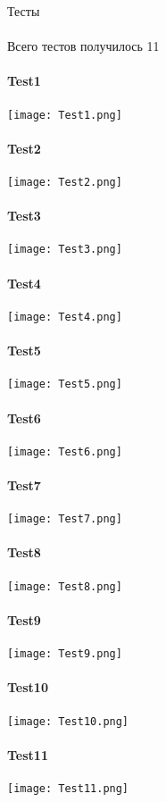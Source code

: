 \documentclass{article}
\begin{document}
\newpage
\huge{Тесты} \\ \\
\Large{Всего тестов получилось 11}
\\ \\
\Large{\textbf{Test1}}
\\ \\
\texttt{[image: Test1.png]}
\\ \\
\Large{\textbf{Test2}}
\\ \\
\texttt{[image: Test2.png]}
\\ \\
\newpage
\Large{\textbf{Test3}}
\\ \\
\texttt{[image: Test3.png]}
\\ \\
\Large{\textbf{Test4}}
\\ \\
\texttt{[image: Test4.png]}
\\ \\
\Large{\textbf{Test5}}
\\ \\
\texttt{[image: Test5.png]}
\\ \\
\newpage
\Large{\textbf{Test6}}
\\ \\
\texttt{[image: Test6.png]}
\\ \\
\Large{\textbf{Test7}}
\\ \\
\texttt{[image: Test7.png]}
\\ \\
\Large{\textbf{Test8}}
\\ \\
\texttt{[image: Test8.png]}
\\ \\
\newpage
\Large{\textbf{Test9}}
\\ \\
\texttt{[image: Test9.png]}
\\ \\
\Large{\textbf{Test10}}
\\ \\
\texttt{[image: Test10.png]}
\\ \\
\Large{\textbf{Test11}}
\\ \\
\texttt{[image: Test11.png]}
\end{document}
